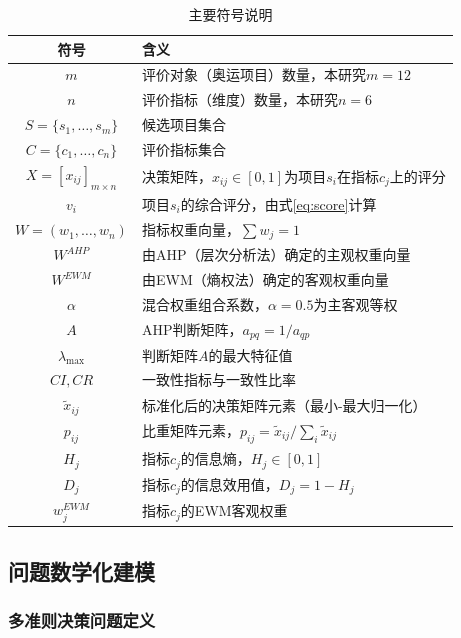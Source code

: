 \documentclass[twoside]{CUGThesis}
\begin{document}
\begin{table}[htbp]
\centering
\small
\caption{主要符号说明}
\label{tab:notation}
\begin{tabularx}{\textwidth}{c>{\raggedright\arraybackslash}X}
\toprule
符号 & 含义 \\
\midrule
$m$ & 评价对象（奥运项目）数量，本研究$m = 12$ \\
$n$ & 评价指标（维度）数量，本研究$n = 6$ \\
$S = \{s_1, \ldots, s_m\}$ & 候选项目集合 \\
$C = \{c_1, \ldots, c_n\}$ & 评价指标集合 \\
$X = [x_{ij}]_{m \times n}$ & 决策矩阵，$x_{ij} \in [0,1]$为项目$s_i$在指标$c_j$上的评分 \\
$v_i$ & 项目$s_i$的综合评分，由式\eqref{eq:score}计算 \\
$W = (w_1, \ldots, w_n)$ & 指标权重向量，$\sum w_j = 1$ \\
$W^{AHP}$ & 由AHP（层次分析法）确定的主观权重向量 \\
$W^{EWM}$ & 由EWM（熵权法）确定的客观权重向量 \\
$\alpha$ & 混合权重组合系数，$\alpha = 0.5$为主客观等权 \\
$A$ & AHP判断矩阵，$a_{pq} = 1/a_{qp}$ \\
$\lambda_{\max}$ & 判断矩阵$A$的最大特征值 \\
$CI, CR$ & 一致性指标与一致性比率 \\
$\tilde{x}_{ij}$ & 标准化后的决策矩阵元素（最小-最大归一化） \\
$p_{ij}$ & 比重矩阵元素，$p_{ij} = \tilde{x}_{ij} / \sum_i \tilde{x}_{ij}$ \\
$H_j$ & 指标$c_j$的信息熵，$H_j \in [0, 1]$ \\
$D_j$ & 指标$c_j$的信息效用值，$D_j = 1 - H_j$ \\
$w_j^{EWM}$ & 指标$c_j$的EWM客观权重 \\
\bottomrule
\end{tabularx}
\end{table}

\subsection{问题数学化建模}

\subsubsection{多准则决策问题定义}
\end{document}
